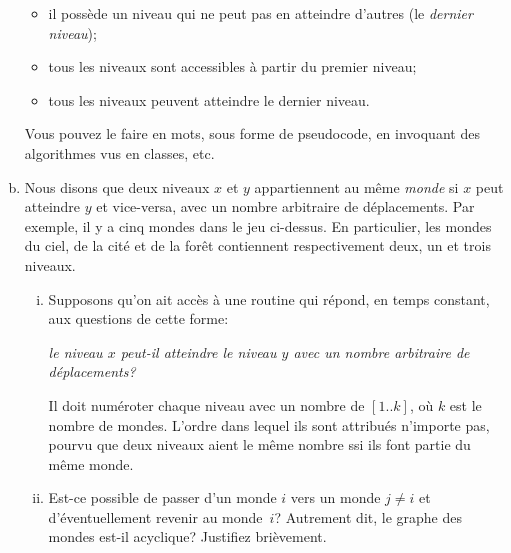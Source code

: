 \documentclass{article}
\begin{document}
\begin{question}
\begin{enumerate}[(a)]
\begin{itemize}
    \item il possède un niveau qui ne peut pas en atteindre d'autres
      (le \emph{dernier niveau});

    \item tous les niveaux sont accessibles à partir du premier niveau;

    \item tous les niveaux peuvent atteindre le dernier niveau.
    \end{itemize}
    \medskip
    
     Vous pouvez le faire en mots, sous forme de
    pseudocode, en invoquant des algorithmes vus en classes, etc.

  \item Nous disons que deux niveaux $x$ et $y$ appartiennent au même
    \emph{monde} si $x$ peut atteindre $y$ et vice-versa, avec un
    nombre arbitraire de déplacements. Par exemple, il y a cinq mondes
    dans le jeu ci-dessus. En particulier, les mondes du ciel, de la
    cité et de la forêt contiennent respectivement deux, un et trois
    niveaux.\label{itm:mondes}\medskip

    \begin{enumerate}[(i)]
    \setlength\itemsep{5pt}

    \item Supposons  qu'on ait accès à une
      routine qui répond, en temps constant, aux questions de cette
      forme:\label{itm:graphe:mondes}

    \begin{center}
      \emph{le niveau $x$ peut-il atteindre le niveau $y$ avec un
        nombre arbitraire de déplacements?}
    \end{center}

     Il doit numéroter chaque niveau avec un nombre de
    $[1..k]$, où $k$ est le nombre de mondes. L'ordre dans lequel ils
    sont attribués n'importe pas, pourvu que deux niveaux aient le même
    nombre ssi ils font partie du même monde.

  \item Est-ce  possible de passer d'un monde
    $i$ vers un monde $j \neq i$ et d'éventuellement revenir au
    monde~$i$? Autrement dit, le \og graphe des mondes \fg{} est-il
    acyclique? Justifiez brièvement.
    

\end{enumerate}
\end{enumerate}
\end{question}
\end{document}

